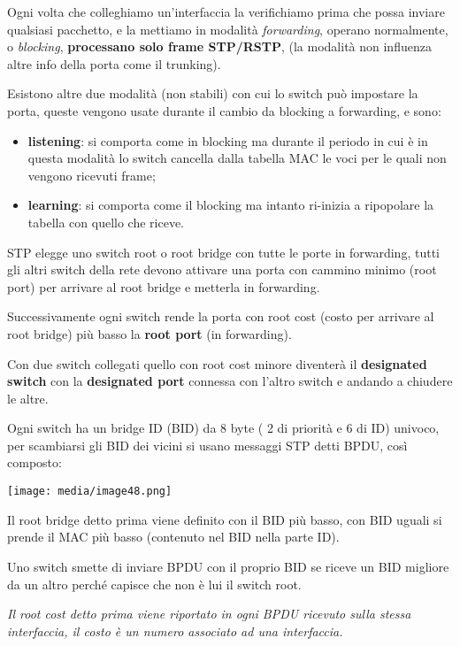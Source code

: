 Ogni volta che colleghiamo un'interfaccia la verifichiamo prima che
possa inviare qualsiasi pacchetto, e la mettiamo in modalità
\emph{forwarding}, operano normalmente, o \emph{blocking},
\textbf{processano solo frame STP/RSTP}, (la modalità non influenza
altre info della porta come il trunking).

Esistono altre due modalità (non stabili) con cui lo switch può
impostare la porta, queste vengono usate durante il cambio da blocking a
forwarding, e sono:

\begin{itemize}
\item
  \textbf{listening}: si comporta come in blocking ma durante il periodo
  in cui è in questa modalità lo switch cancella dalla tabella MAC le
  voci per le quali non vengono ricevuti frame;
\item
  \textbf{learning}: si comporta come il blocking ma intanto ri-inizia a
  ripopolare la tabella con quello che riceve.
\end{itemize}

STP elegge uno switch root o root bridge con tutte le porte in
forwarding, tutti gli altri switch della rete devono attivare una porta
con cammino minimo (root port) per arrivare al root bridge e metterla in
forwarding.

Successivamente ogni switch rende la porta con root cost (costo per
arrivare al root bridge) più basso la \textbf{root port} (in
forwarding).

Con due switch collegati quello con root cost minore diventerà il
\textbf{designated switch} con la \textbf{designated port} connessa con
l'altro switch e andando a chiudere le altre.

Ogni switch ha un bridge ID (BID) da 8 byte ( 2 di priorità e 6 di ID)
univoco, per scambiarsi gli BID dei vicini si usano messaggi STP detti
BPDU, così composto:

\texttt{[image: media/image48.png]}

Il root bridge detto prima viene definito con il BID più basso, con BID
uguali si prende il MAC più basso (contenuto nel BID nella parte ID).

Uno switch smette di inviare BPDU con il proprio BID se riceve un BID
migliore da un altro perché capisce che non è lui il switch root.

\emph{Il root cost detto prima viene riportato in ogni BPDU ricevuto
sulla stessa interfaccia, il costo è un numero associato ad una
interfaccia.}

